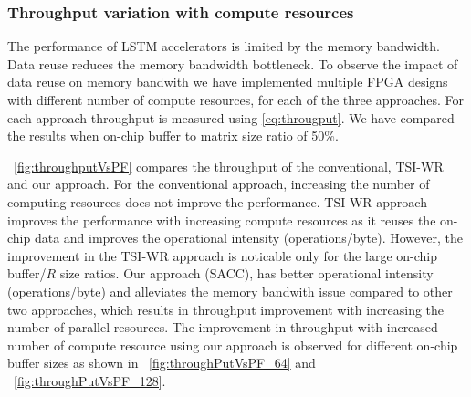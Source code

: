 {{{{\subsubsection{Throughput variation with compute resources}
The performance of LSTM accelerators is limited by the memory bandwidth. Data reuse reduces the memory bandwidth bottleneck. To observe the impact of data reuse on memory bandwith we have implemented multiple FPGA designs with different number of compute resources, for each of the three approaches. For each approach throughput is measured using \eqref{eq:througput}. We have compared the results when on-chip buffer to matrix size ratio of 50\%. 

\figurename{~\ref{fig:throughputVsPF}} compares the throughput of the conventional, TSI-WR and our approach. 
For the conventional approach, increasing the number of computing resources does not improve the performance. TSI-WR approach improves the performance with increasing compute resources as it reuses the on-chip data and improves the operational intensity (operations/byte). However, the improvement in the TSI-WR approach is noticable only for the large on-chip buffer/$R$ size ratios. Our approach (SACC), has better operational intensity (operations/byte) and alleviates the memory bandwith issue compared to other two approaches, which results in throughput improvement with increasing the number of parallel resources. The improvement in throughput with increased number of compute resource using our approach is observed for different on-chip buffer sizes as shown in \figurename{~\ref{fig:throughPutVsPF_64}} and \figurename{~\ref{fig:throughPutVsPF_128}}.
}}}}
